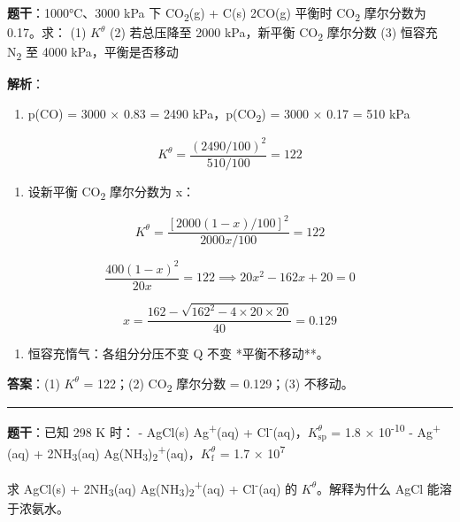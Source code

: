 \textbf{题干}：1000°C、3000 kPa 下 CO\textsubscript{2}(g) + C(s) \衡 2CO(g) 平衡时 CO\textsubscript{2} 摩尔分数为 0.17。求：
(1) \(K^\theta\)
(2) 若总压降至 2000 kPa，新平衡 CO\textsubscript{2} 摩尔分数
(3) 恒容充 N\textsubscript{2} 至 4000 kPa，平衡是否移动

\textbf{解析}：

\begin{enumerate}
\def\labelenumi{(\arabic{enumi})}
\tightlist
\item
  p(CO) = 3000 × 0.83 = 2490 kPa，p(CO\textsubscript{2}) = 3000 × 0.17 = 510 kPa
\end{enumerate}

\[K^\theta = \frac{(2490/100)^2}{510/100} = 122\]

\begin{enumerate}
\def\labelenumi{(\arabic{enumi})}
\setcounter{enumi}{1}
\tightlist
\item
  设新平衡 CO\textsubscript{2} 摩尔分数为 x：
\end{enumerate}

\[K^\theta = \frac{[2000(1-x)/100]^2}{2000x/100} = 122\]

\[\frac{400(1-x)^2}{20x} = 122 \implies 20x^2 - 162x + 20 = 0\]

\[x = \frac{162 - \sqrt{162^2 - 4 \times 20 \times 20}}{40} = 0.129\]

\begin{enumerate}
\def\labelenumi{(\arabic{enumi})}
\setcounter{enumi}{2}
\tightlist
\item
  恒容充惰气：各组分分压不变 \箭 Q 不变 \箭 **平衡不移动**。
\end{enumerate}

\textbf{答案}：(1) \(K^\theta\) = 122；(2) CO\textsubscript{2} 摩尔分数 = 0.129；(3) 不移动。

\begin{center}\rule{0.5\linewidth}{0.5pt}\end{center}

\textbf{题干}：已知 298 K 时：
- AgCl(s) \衡 Ag\textsuperscript{+}(aq) + Cl\textsuperscript{-}(aq)，\(K_{\mathrm{sp}}^\theta\) = 1.8 × 10\textsuperscript{-10}
- Ag\textsuperscript{+}(aq) + 2NH\textsubscript{3}(aq) \衡 Ag(NH\textsubscript{3})\textsubscript{2}\textsuperscript{+}(aq)，\(K_{\mathrm f}^\theta\) = 1.7 × 10\textsuperscript{7}

求 AgCl(s) + 2NH\textsubscript{3}(aq) \衡 Ag(NH\textsubscript{3})\textsubscript{2}\textsuperscript{+}(aq) + Cl\textsuperscript{-}(aq) 的 \(K^\theta\)。解释为什么 AgCl 能溶于浓氨水。

